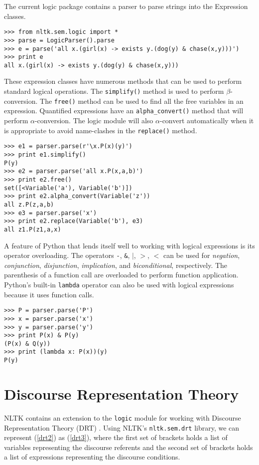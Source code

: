 \documentclass{article}
\newcommand{\dhgcode}[1]{{\tt #1}}
\begin{document}
The current logic package contains a parser to parse strings into the Expression classes.

\begin{verbatim}
>>> from nltk.sem.logic import *
>>> parse = LogicParser().parse
>>> e = parse('all x.(girl(x) -> exists y.(dog(y) & chase(x,y)))')
>>> print e
all x.(girl(x) -> exists y.(dog(y) & chase(x,y)))
\end{verbatim}

These expression classes have numerous methods that can be used to perform standard logical operations.  The \dhgcode{simplify()} method is used to perform $\beta$-conversion.  The \dhgcode{free()} method can be used to find all the free variables in an expression.  Quantified expressions have an \dhgcode{alpha\_convert()} method that will perform $\alpha$-conversion.  The logic module will also $\alpha$-convert automatically when it is appropriate to avoid name-clashes in the \dhgcode{replace()} method.

\begin{verbatim}
>>> e1 = parser.parse(r'\x.P(x)(y)')
>>> print e1.simplify()
P(y)
>>> e2 = parser.parse('all x.P(x,a,b)')
>>> print e2.free()
set([<Variable('a'), Variable('b')])
>>> print e2.alpha_convert(Variable('z'))
all z.P(z,a,b)
>>> e3 = parser.parse('x')
>>> print e2.replace(Variable('b'), e3)
all z1.P(z1,a,x)
\end{verbatim}

A feature of Python that lends itself well to working with logical expressions is its operator overloading.  The operators \dhgcode{-}, \dhgcode{\&}, \dhgcode{$|$}, \dhgcode{$>$}, \dhgcode{$<$} can be used for \emph{negation}, \emph{conjunction}, \emph{disjunction}, \emph{implication}, and \emph{biconditional}, respectively.  The parenthesis of a function call are overloaded to perform function application.  Python's built-in \dhgcode{lambda} operator can also be used with logical expressions because it uses function calls.

\begin{verbatim}
>>> P = parser.parse('P')
>>> x = parser.parse('x')
>>> y = parser.parse('y')
>>> print P(x) & P(y)
(P(x) & Q(y))
>>> print (lambda x: P(x))(y)
P(y)
\end{verbatim}


\section{Discourse Representation Theory}
NLTK contains an extension to the \dhgcode{logic} module for working with Discourse Representation Theory (DRT) \cite{KampReyle}.  Using NLTK's \dhgcode{nltk.sem.drt} library, we can represent (\ref{drt2}) as (\ref{drt3}), where the first set of brackets holds a list of variables representing the discourse referents and the second set of brackets holds a list of expressions representing the discourse conditions.
\end{document}
